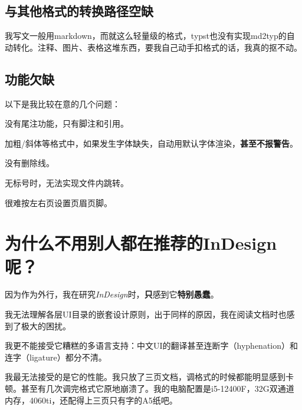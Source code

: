 \documentclass[10pt,openany]{book}
\begin{document}
\begin{sloppypar}
    \subsection{与其他格式的转换路径空缺}

    我写文一般用markdown，而就这么轻量级的格式，typst也没有实现md2typ的自动转化。注释、图片、表格这堆东西，要我自己动手扣格式的话，我真的抠不动。

    \subsection{功能欠缺}

    以下是我比较在意的几个问题：

    \begin{tightenum}
        \item   没有尾注功能，只有脚注和引用。
        \item   加粗/斜体等格式中，如果发生字体缺失，自动用默认字体渲染，\textbf{甚至不报警告}。
        \item   没有删除线。
        \item   无标号时，无法实现文件内跳转。
        \item   很难按左右页设置页眉页脚。
    \end{tightenum}

    \section{为什么不用别人都在推荐的InDesign呢？}

    因为作为外行，我在研究\textit{InDesign}时，\textbf{只}感到它\textbf{特别愚蠢}。

    我无法理解各层UI目录的嵌套设计原则，出于同样的原因，我在阅读文档时也感到了极大的困扰。

    我更不能接受它糟糕的多语言支持：中文UI的翻译甚至连断字（hyphenation）和连字（ligature）都分不清。

    我最无法接受的是它的性能。我只放了三页文档，调格式的时候都能明显感到卡顿。甚至有几次调完格式它原地崩溃了。我的电脑配置是i5-12400F，32G双通道内存，4060ti，还配得上三页只有字的A5纸吧。

    \thispagestyle{mystyle}

\end{sloppypar}
\end{document}
